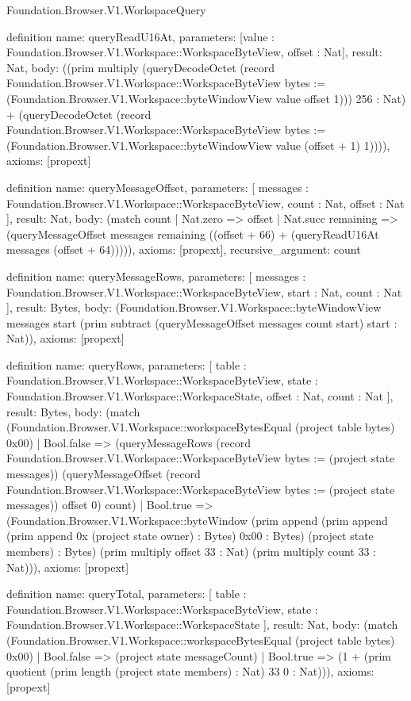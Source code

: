 \begin{lexlean}{Foundation.Browser.V1.WorkspaceQuery}
\begin{semanticmodule}
definition{
  name: queryReadU16At,
  parameters: [value : Foundation.Browser.V1.Workspace::WorkspaceByteView, offset : Nat],
  result: Nat,
  body: ((prim multiply (queryDecodeOctet (record Foundation.Browser.V1.Workspace::WorkspaceByteView {bytes := (Foundation.Browser.V1.Workspace::byteWindowView value offset 1)})) 256 : Nat) + (queryDecodeOctet (record Foundation.Browser.V1.Workspace::WorkspaceByteView {bytes := (Foundation.Browser.V1.Workspace::byteWindowView value (offset + 1) 1)}))),
  axioms: [propext]
}

definition{
  name: queryMessageOffset,
  parameters: [
    messages : Foundation.Browser.V1.Workspace::WorkspaceByteView,
    count : Nat,
    offset : Nat
  ],
  result: Nat,
  body: (match count
    | Nat.zero => offset
    | Nat.succ remaining => (queryMessageOffset messages remaining ((offset + 66) + (queryReadU16At messages (offset + 64))))),
  axioms: [propext],
  recursive_argument: count
}

definition{
  name: queryMessageRows,
  parameters: [
    messages : Foundation.Browser.V1.Workspace::WorkspaceByteView,
    start : Nat,
    count : Nat
  ],
  result: Bytes,
  body: (Foundation.Browser.V1.Workspace::byteWindowView messages start (prim subtract (queryMessageOffset messages count start) start : Nat)),
  axioms: [propext]
}

definition{
  name: queryRows,
  parameters: [
    table : Foundation.Browser.V1.Workspace::WorkspaceByteView,
    state : Foundation.Browser.V1.Workspace::WorkspaceState,
    offset : Nat,
    count : Nat
  ],
  result: Bytes,
  body: (match (Foundation.Browser.V1.Workspace::workspaceBytesEqual (project table bytes) 0x00)
    | Bool.false => (queryMessageRows (record Foundation.Browser.V1.Workspace::WorkspaceByteView {bytes := (project state messages)}) (queryMessageOffset (record Foundation.Browser.V1.Workspace::WorkspaceByteView {bytes := (project state messages)}) offset 0) count)
    | Bool.true => (Foundation.Browser.V1.Workspace::byteWindow (prim append (prim append (prim append 0x (project state owner) : Bytes) 0x00 : Bytes) (project state members) : Bytes) (prim multiply offset 33 : Nat) (prim multiply count 33 : Nat))),
  axioms: [propext]
}

definition{
  name: queryTotal,
  parameters: [
    table : Foundation.Browser.V1.Workspace::WorkspaceByteView,
    state : Foundation.Browser.V1.Workspace::WorkspaceState
  ],
  result: Nat,
  body: (match (Foundation.Browser.V1.Workspace::workspaceBytesEqual (project table bytes) 0x00)
    | Bool.false => (project state messageCount)
    | Bool.true => (1 + (prim quotient (prim length (project state members) : Nat) 33 0 : Nat))),
  axioms: [propext]
}


\end{semanticmodule}
\end{lexlean}

